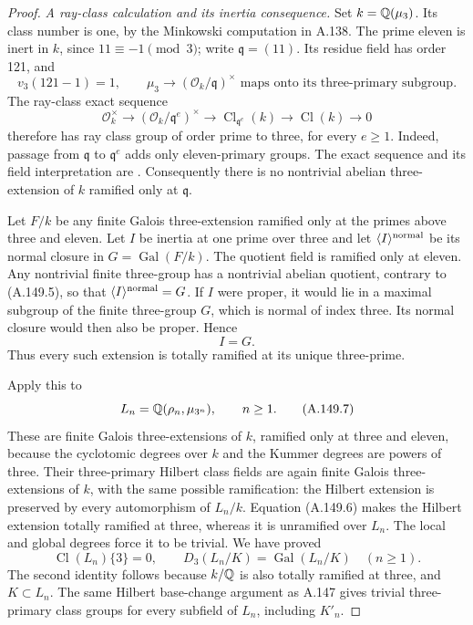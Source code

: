 \begin{proof}
\emph{A ray-class calculation and its inertia consequence.}
Set \(k=\mathbb Q(\mu_3)\).
Its class number is one, by the Minkowski computation in
A.138.  The prime eleven is inert in \(k\), since
\(11\equiv-1\pmod3\); write \(\mathfrak q=(11)\).
Its residue field has order 121, and
\[
 v_3(121-1)=1,
 \qquad
 \mu_3\longrightarrow(\mathcal O_k/\mathfrak q)^\times
        \text{ maps onto its three-primary subgroup}.
\tag{A.149.4}
\]
The ray-class exact sequence
\[
 \mathcal O_k^\times\longrightarrow
 (\mathcal O_k/\mathfrak q^e)^\times
 \longrightarrow\operatorname{Cl}_{\mathfrak q^e}(k)
 \longrightarrow\operatorname{Cl}(k)\longrightarrow0
\tag{A.149.5}
\]
therefore has ray class group of order prime to three,
for every \(e\geq1\).
Indeed, passage from \(\mathfrak q\) to
\(\mathfrak q^e\) adds only eleven-primary groups.
The exact sequence and its field interpretation are
\cite[V, Theorems 1.7, 3.5 and 3.6]{MilneCFT}.
Consequently there is no nontrivial abelian
three-extension of \(k\) ramified only at
\(\mathfrak q\).

Let \(F/k\) be any finite Galois three-extension
ramified only at the primes above three and eleven.
Let \(I\) be inertia at one prime over three and
let \(\langle I\rangle^{\rm normal}\) be its normal
closure in \(G=\operatorname{Gal}(F/k)\).
The quotient field is ramified only at eleven.
Any nontrivial finite three-group has a nontrivial
abelian quotient, contrary to (A.149.5), so that
\(\langle I\rangle^{\rm normal}=G\).
If \(I\) were proper, it would lie in a maximal
subgroup of the finite three-group \(G\), which is
normal of index three.  Its normal closure would
then also be proper.  Hence
\[
                          I=G.
\tag{A.149.6}
\]
Thus every such extension is totally ramified at its
unique three-prime.

Apply this to
\[
                 L_n=\mathbb Q(\rho_n,\mu_{3^n}),\qquad n\geq1.
\tag{A.149.7}
\]
These are finite Galois three-extensions of \(k\),
ramified only at three and eleven, because the
cyclotomic degrees over \(k\) and the Kummer degrees
are powers of three.
Their three-primary Hilbert class fields are again
finite Galois three-extensions of \(k\), with the
same possible ramification: the Hilbert extension
is preserved by every automorphism of \(L_n/k\).
Equation (A.149.6) makes the Hilbert extension
totally ramified at three, whereas it is unramified
over \(L_n\).  The local and global degrees force
it to be trivial.  We have proved
\[
 \operatorname{Cl}(L_n)\{3\}=0,
 \qquad D_3(L_n/K)=\operatorname{Gal}(L_n/K)
                  \quad(n\geq1).
\tag{A.149.8}
\]
The second identity follows because \(k/\mathbb Q\) is
also totally ramified at three, and \(K\subset L_n\).
The same Hilbert base-change argument as A.147 gives
trivial three-primary class groups for every subfield
of \(L_n\), including \(K'_n\).


\end{proof}
